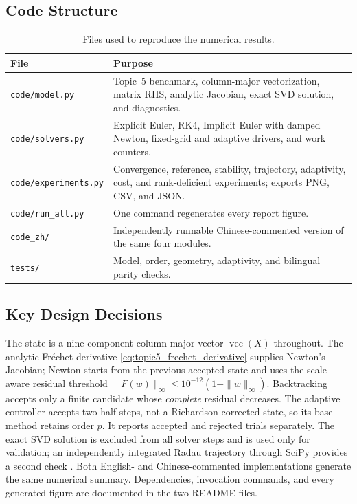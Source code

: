 \documentclass[11pt,a4paper]{article}
\theoremstyle{definition}
\theoremstyle{remark}
\begin{document}
\subsection{Code Structure}
\begin{table}[H]
\centering
\begin{tabular}{lp{}}
\toprule
\textbf{File} & \textbf{Purpose} \\
\midrule
\texttt{code/model.py} & Topic~5 benchmark, column-major vectorization,
  matrix RHS, analytic Jacobian, exact SVD solution, and diagnostics. \\
\texttt{code/solvers.py} & Explicit Euler, RK4, Implicit Euler with
  damped Newton, fixed-grid and adaptive drivers, and work counters. \\
\texttt{code/experiments.py} & Convergence, reference, stability,
  trajectory, adaptivity, cost, and rank-deficient experiments;
  exports PNG, CSV, and JSON. \\
\texttt{code/run\_all.py} & One command regenerates every report figure. \\
\texttt{code\_zh/} & Independently runnable Chinese-commented version of
  the same four modules. \\
\texttt{tests/} & Model, order, geometry, adaptivity, and bilingual
  parity checks. \\
\bottomrule
\end{tabular}
\caption{Files used to reproduce the numerical results.}
\label{tab:code_structure}
\end{table}

\subsection{Key Design Decisions}
The state is a nine-component column-major vector
$\operatorname{vec}(X)$ throughout. The analytic Fr\'echet derivative
\eqref{eq:topic5_frechet_derivative} supplies Newton's Jacobian;
Newton starts from the previous accepted state and uses the
scale-aware residual threshold
$\|F(w)\|_\infty\leq10^{-12}(1+\|w\|_\infty)$.
Backtracking accepts only a finite candidate whose \emph{complete}
residual decreases. The adaptive controller accepts two half steps,
not a Richardson-corrected state, so its base method retains order
$p$. It reports accepted and rejected trials separately. The exact
SVD solution is excluded from all solver steps and is used only for
validation; an independently integrated Radau trajectory through
SciPy provides a second check \cite{virtanen2020}. Both English- and Chinese-commented implementations
generate the same numerical summary. Dependencies, invocation
commands, and every generated figure are documented in the two
README files.
\end{document}
